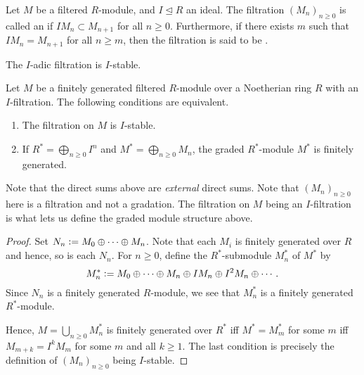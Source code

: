 \begin{defn} \label{defn:I-filtration}
	Let $M$ be a filtered $R$-module, and $I \unlhd R$ an ideal. The filtration $(M_{n})_{n \ge 0}$ is called an  if $I M_{n} \subset M_{n + 1}$ for all $n \ge 0$. \newline
	Furthermore, if there exists $m$ such that $I M_{n} = M_{n + 1}$ for all $n \ge m$, then the filtration is said to be .
\end{defn}

\begin{ex}
	The $I$-adic filtration is $I$-stable.
\end{ex}

\begin{prop} \label{prop:filtration-I-stable-equivalent}
	Let $M$ be a finitely generated filtered $R$-module over a Noetherian ring $R$ with an $I$-filtration. The following conditions are equivalent.
	\begin{enumerate}
		\item The filtration on $M$ is $I$-stable.
		\item If $R^{\ast} = \bigoplus_{n \ge 0} I^{n}$ and $M^{\ast} = \bigoplus_{n \ge 0} M_{n}$, the graded $R^{\ast}$-module $M^{\ast}$ is finitely generated.
	\end{enumerate}
\end{prop}
Note that the direct sums above are \emph{external} direct sums. Note that $(M_{n})_{n \ge 0}$ here is a filtration and not a gradation. The filtration on $M$ being an $I$-filtration is what lets us define the graded module structure above. 
\begin{proof} 
	Set $N_{n} \vcentcolon= M_{0} \oplus \cdots \oplus M_{n}$. Note that each $M_{i}$ is finitely generated over $R$ and hence, so is each $N_{n}$. For $n \ge 0$, define the $R^{\ast}$-submodule $M_{n}^{\ast}$ of $M^{\ast}$ by
	\begin{equation*} 
		M_{n}^{\ast} \vcentcolon= M_{0} \oplus \cdots \oplus M_{n} \oplus I M_{n} \oplus I^{2} M_{n} \oplus \cdots.
	\end{equation*}
	Since $N_{n}$ is a finitely generated $R$-module, we see that $M_{n}^{\ast}$ is a finitely generated $R^{\ast}$-module.

	Hence, $M = \bigcup_{n \ge 0} M_{n}^{\ast}$ is finitely generated over $R^{\ast}$ iff $M^{\ast} = M_{m}^{\ast}$ for some $m$ iff $M_{m + k} = I^{k} M_{m}$ for some $m$ and all $k \ge 1$. The last condition is precisely the definition of $(M_{n})_{n \ge 0}$ being $I$-stable.
\end{proof}

